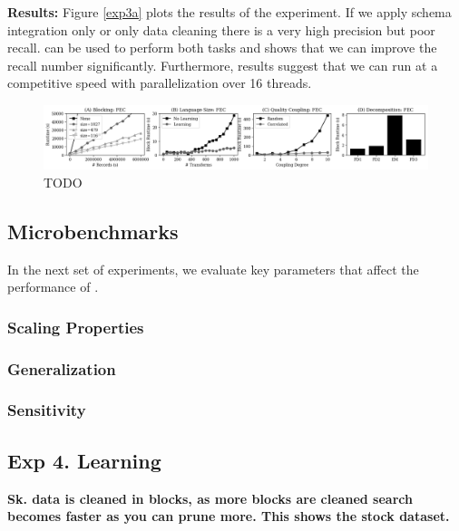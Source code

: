 \vspace{0.5em}\noindent\textbf{Results: } Figure \ref{exp3a} plots the results of the experiment. If we apply schema integration only or only data cleaning there is a very high precision but poor recall. \sys can be used to perform both tasks and shows that we can improve the recall number significantly.
Furthermore, results suggest that we can run \sys at a competitive speed with parallelization over 16 threads.

 \begin{figure}[ht]
\centering
 \includegraphics[width=\textwidth]{exp/exp4.png}
 \caption{TODO
 \label{fig:microbenchmarks}}
\end{figure}

\subsection{Microbenchmarks}
In the next set of experiments, we evaluate key parameters that affect the performance of \sys.

\subsubsection{Scaling Properties}


\subsubsection{Generalization}


\subsubsection{Sensitivity}





\subsection{Exp 4. Learning}

\textbf{Sk. data is cleaned in blocks, as more blocks are cleaned search becomes faster as you can prune more. This shows the stock dataset.}

